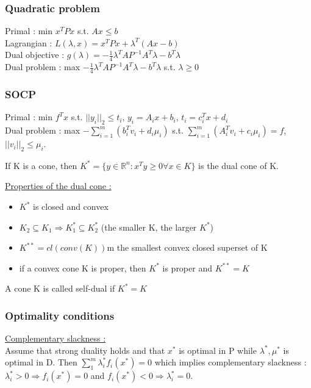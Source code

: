 \documentclass[../main.tex]{subfiles}
\begin{document}
\subsubsection{Quadratic problem}
Primal : min $x^T Px$ s.t. $Ax\leq b$\\
Lagrangian : $L(\lambda, x) = x^T P x + \lambda^T (Ax-b)$\\
Dual objective : $g(\lambda) = -\frac{1}{4} \lambda^T A P^{-1} A^T \lambda - b^T \lambda$\\
Dual problem : max $-\frac{1}{4} \lambda^T AP^{-1} A^T \lambda - b^T \lambda$ s.t. $\lambda \geq 0$\\

\subsubsection{SOCP}
Primal : min $f^T x$ s.t. $\lvert \lvert y_i \rvert \rvert_2 \leq t_i$, $y_i = A_i x + b_i$, $t_i = c_i^Tx+d_i$\\
Dual problem : max $-\sum_{i=1}^m (b_i^T v_i + d_i \mu_i)$ s.t. $\sum_{i=1}^m (A_i^T v_i + c_i \mu_i) = f$, $\lvert \lvert v_i \rvert \rvert_2 \leq \mu_i$.\\

\begin{theorem}
    If K is a cone, then $K^* = \{ y \in \mathbb{R}^n : x^T y \geq 0 \forall x \in K\}$ is the dual cone of K.
\end{theorem}

\quad \underline{Properties of the dual cone :}\\
\begin{itemize}
    \item $K^*$ is closed and convex
    \item $K_2 \subseteq K_1 \Rightarrow K_1^* \subseteq K_2^*$ (the smaller K, the larger $K^*$)
    \item $K^{**} = cl(conv(K))$m the smallest convex closed superset of K
    \item if a convex cone K is proper, then $K^*$ is proper and $K^{**} = K$
\end{itemize}

\warning A cone K is called self-dual if $K^* = K$\\

\subsubsection{Optimality conditions}
\quad \underline{Complementary slackness :}\\
Assume that strong duality holds and that $x^*$ is optimal in P while $\lambda^*, \mu^*$ is optimal in D. Then $\sum_1^m \lambda_i^* f_i(x^*) = 0$ which implies complementary slackness : $\lambda_i^* >0 \Rightarrow f_i(x^*) = 0$ and $f_i(x^*) < 0 \Rightarrow \lambda_i^* = 0$.\\
\end{document}
